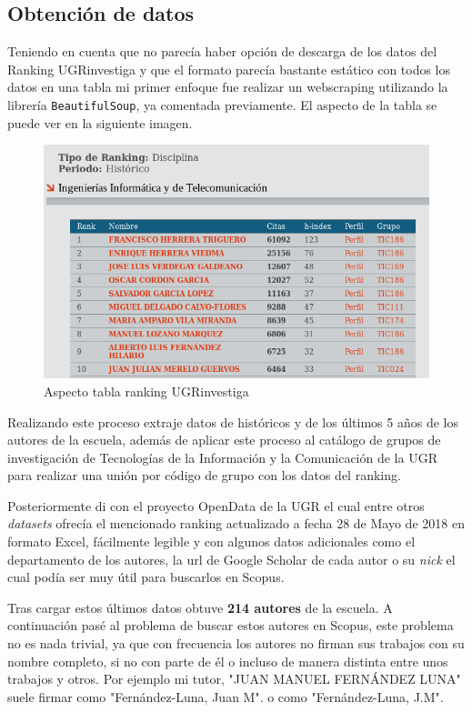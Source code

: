 \subsection{Obtención de datos}

Teniendo en cuenta que no parecía haber opción de descarga de los datos del Ranking UGRinvestiga y que el formato parecía bastante estático con todos los datos en una tabla mi primer enfoque fue realizar un \gls{webscraping} utilizando la librería \texttt{BeautifulSoup}, ya comentada previamente. El aspecto de la tabla se puede ver en la siguiente imagen.


\begin{figure}[h!]
	
	\centering
	\includegraphics[width=0.9\linewidth]{imagenes/aspectoRankingUGRi}
	\caption{Aspecto tabla ranking UGRinvestiga}
\end{figure}

Realizando este proceso extraje datos de históricos y de los últimos 5 años de los autores de la escuela, además de aplicar este proceso al catálogo de grupos de investigación de Tecnologías de la Información y la Comunicación de la  \acrshort{UGR} para realizar una unión por código de grupo con los datos del ranking.

Posteriormente di con el proyecto OpenData de la \acrlong{UGR} el cual entre otros \textit{datasets} ofrecía el mencionado ranking actualizado a fecha 28 de Mayo de 2018 \cite{opendataUGR} en formato Excel, fácilmente legible y con algunos datos adicionales como el departamento de los autores, la url de Google Scholar de cada autor o su \textit{nick} el cual podía ser muy útil para buscarlos en Scopus.

Tras cargar estos últimos datos obtuve \textbf{214 autores} de la escuela. A continuación pasé al problema de buscar estos autores en Scopus, este problema no es nada trivial, ya que con frecuencia los autores no firman sus trabajos con su nombre completo, si no con parte de él o incluso de manera distinta entre unos trabajos y otros. Por ejemplo mi tutor, "JUAN MANUEL FERNÁNDEZ LUNA" suele firmar como "Fernández-Luna, Juan M". o como "Fernández-Luna, J.M".

